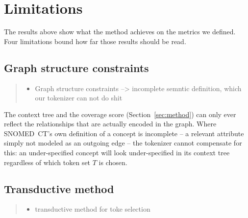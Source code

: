 \section{Limitations}
\label{sec:limitations}


The results above show what the method achieves on the metrics we defined.
Four limitations bound how far those results should be read.

\subsection{Graph structure constraints}

\begin{quote}\small\itshape
\begin{itemize}
\item Graph structure constraints --> incomplete semntic definition, which our tokenizer can not do shit
\end{itemize}
\end{quote}

The context tree and the coverage score (Section~\ref{sec:method}) can only
ever reflect the relationships that are actually encoded in the graph. Where
SNOMED~CT's own definition of a concept is incomplete -- a relevant attribute
simply not modeled as an outgoing edge -- the tokenizer cannot compensate for
this: an under-specified concept will look under-specified in its context
tree regardless of which token set $T$ is chosen. 

\subsection{Transductive method}

\begin{quote}\small\itshape
\begin{itemize}
\item transductive method for toke selection
\end{itemize}
\end{quote}

